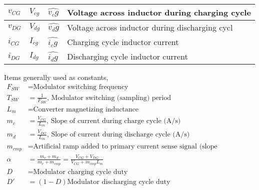 \documentclass{scrartcl}
\begin{document}
\begin{table}[]
\begin{tabular}{|l|l|l|l|}
		$v_{CG}$                                                           & $V_{cg}$                                                                                     & $\hat{v_cg}$                                                                                 & Voltage across inductor during charging cycle                \\ \hline
		$v_{DG}$                                                           & $V_{dg}$                                                                                     & $\hat{v_dg}$                                                                                 & Voltage across inductor during discharging cycl              \\ \hline
		$i_{CG}$                                                           & $I_{cg}$                                                                                     & $\hat{i_cg}$                                                                                 & Charging cycle inductor current                              \\ \hline
		$i_{DG}$                                                           & $I_{dg}$                                                                                     & $\hat{i_dg}$                                                                                 & Discharging cycle inductor current                           \\ \hline
	\end{tabular}
\end{table}

			Items generally used as constants,
			\begin{align*}	
			F_{SW} &= \text{Modulator switching frequency}\\
			T_{SW} &= \frac{1}{F_{SW}}\text{, Modulator switching (sampling) period} \\
			L_m &= \text{Converter magnetizing inductance} \\
			m_c &= \frac{V_{CG}} {L_m}\text{, Slope of current during charge cycle (A/s)} \\
			m_d &= \frac{V_{DG}} {L_m}\text{, Slope of current during discharge cycle (A/s)}\\
			m_{cmp} &= \text{Artificial ramp added to primary current sense signal (slope compensation) (A/s)}\\
			\alpha &= \frac{m_c + m_d} {m_c + m_{cmp}} =  \frac{V_{CG} + V_{DG}} {V_{CG} + m_{cmp} L_m}\\
			D &= \text{Modulator charging cycle duty} \\
			D' &= (1-D) \text{Modulator discharging cycle duty}\\	
			\end{align*}
			
\end{document}
